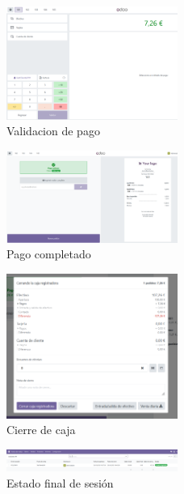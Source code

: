 \documentclass[a4paper,12pt]{article}
\begin{document}
\begin{figure}[h!]
    \centering
    \includegraphics[width=0.5\textwidth]{pr2odoo58-validacionPago.png}
    \caption{Validacion de pago}
\end{figure}
\FloatBarrier

\begin{figure}[h!]
    \centering
    \includegraphics[width=0.5\textwidth]{pr2odoo59-pagoCompletado101.png}
    \caption{Pago completado}
\end{figure}
\FloatBarrier

\begin{figure}[h!]
    \centering
    \includegraphics[width=0.5\textwidth]{pr2odoo60-cierreCaja.png}
    \caption{Cierre de caja}
\end{figure}
\FloatBarrier

\begin{figure}[h!]
    \centering
    \includegraphics[width=0.5\textwidth]{pr2odoo61-estadoFinalSesion.png}
    \caption{Estado final de sesión}
\end{figure}
\FloatBarrier
\end{document}
